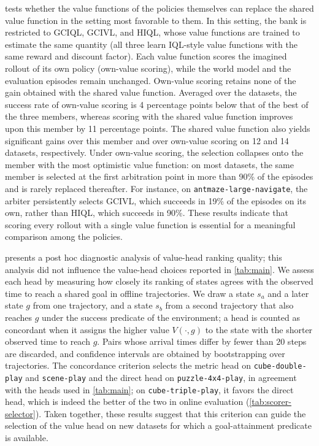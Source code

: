 \documentclass{article}
\theoremstyle{plain}
\theoremstyle{definition}
\theoremstyle{plain}
\begin{document}
 tests whether the value functions of the policies themselves can replace the shared value function in the setting most favorable to them.
In this setting, the bank is restricted to GCIQL, GCIVL, and HIQL, whose value functions are trained to estimate the same quantity (all three learn IQL-style value functions with the same reward and discount factor).
Each value function scores the imagined rollout of its own policy (own-value scoring), while the world model and the evaluation episodes remain unchanged.
Own-value scoring retains none of the gain obtained with the shared value function.
Averaged over the \NumEnvs{} datasets, the success rate of own-value scoring is 4 percentage points below that of the best of the three members, whereas scoring with the shared value function improves upon this member by 11 percentage points.
The shared value function also yields significant gains over this member and over own-value scoring on 12 and 14 datasets, respectively.
Under own-value scoring, the selection collapses onto the member with the most optimistic value function: on most datasets, the same member is selected at the first arbitration point in more than 90\% of the episodes and is rarely replaced thereafter.
For instance, on \texttt{antmaze-large-navigate}, the arbiter persistently selects GCIVL, which succeeds in 19\% of the episodes on its own, rather than HIQL, which succeeds in 90\%.
These results indicate that scoring every rollout with a single value function is essential for a meaningful comparison among the policies.

 presents a post hoc diagnostic analysis of value-head ranking quality; this analysis did not influence the value-head choices reported in \cref{tab:main}. We assess each head by measuring how closely its ranking of states agrees with the observed time to reach a shared goal in offline trajectories. We draw a state $s_a$ and a later state $g$ from one trajectory, and a state $s_b$ from a second trajectory that also reaches $g$ under the success predicate of the environment; a head is counted as concordant when it assigns the higher value $V(\cdot,g)$ to the state with the shorter observed time to reach $g$. Pairs whose arrival times differ by fewer than $20$ steps are discarded, and confidence intervals are obtained by bootstrapping over trajectories. The concordance criterion selects the metric head on \texttt{cube-double-play} and \texttt{scene-play} and the direct head on \texttt{puzzle-4x4-play}, in agreement with the heads used in \cref{tab:main}; on \texttt{cube-triple-play}, it favors the direct head, which is indeed the better of the two in online evaluation (\cref{tab:scorer-selector}). Taken together, these results suggest that this criterion can guide the selection of the value head on new datasets for which a goal-attainment predicate is available.
\end{document}
